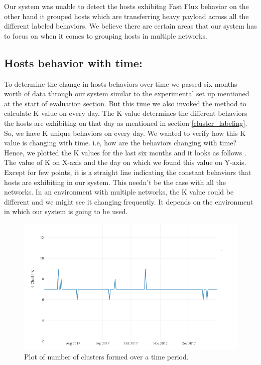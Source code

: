 Our system was unable to detect the hosts exhibitng Fast Flux behavior on the other hand it grouped hosts which are transferring heavy payload across all the different labeled behaviors. We believe there are certain areas that our system has to focus on when it comes to grouping hosts in multiple networks.


\subsection{Hosts behavior with time:}

To determine the change in hosts behaviors over time we passed six months worth of data through our system similar to the experimental set up mentioned at the start of evaluation section. But this time we also invoked the method to calculate K value on every day. The K value determines the different behaviors the hosts are exhibiting on that day as mentioned in section \ref{cluster_labeling}. So, we have K unique behaviors on every day. We wanted to verify how this K value is changing with time. i.e, how are the behaviors changing with time? Hence, we plotted the K values for the last six months and it looks as follows . The value of K on X-axis and the day on which we found this value on Y-axis. Except for few points, it is a straight line indicating the constant behaviors that hosts are exhibiting in our system. This needn't be the case with all the networks. In an environment with multiple networks, the K value could be different and we might see it changing frequently. It depends on the environment in which our system is going to be used.

\begin{figure}[b]
	\centerline{\includegraphics{constant.png}}
	\caption{ Plot of number of clusters formed over a time period.}%
\end{figure}

